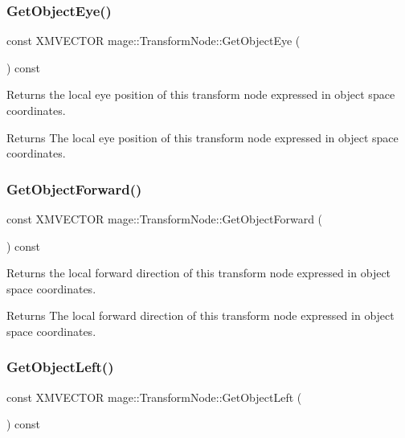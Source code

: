 \subsubsection{\texorpdfstring{Get\+Object\+Eye()}{GetObjectEye()}}
{\footnotesize\ttfamily const X\+M\+V\+E\+C\+T\+OR mage\+::\+Transform\+Node\+::\+Get\+Object\+Eye (\begin{DoxyParamCaption}{ }\end{DoxyParamCaption}) const}

Returns the local eye position of this transform node expressed in object space coordinates.

\begin{DoxyReturn}{Returns}
The local eye position of this transform node expressed in object space coordinates. 
\end{DoxyReturn}
\hypertarget{classmage_1_1_transform_node_a2f3c5ea3a0a301181b611b808842c70a}{}\label{classmage_1_1_transform_node_a2f3c5ea3a0a301181b611b808842c70a} 
\subsubsection{\texorpdfstring{Get\+Object\+Forward()}{GetObjectForward()}}
{\footnotesize\ttfamily const X\+M\+V\+E\+C\+T\+OR mage\+::\+Transform\+Node\+::\+Get\+Object\+Forward (\begin{DoxyParamCaption}{ }\end{DoxyParamCaption}) const}

Returns the local forward direction of this transform node expressed in object space coordinates.

\begin{DoxyReturn}{Returns}
The local forward direction of this transform node expressed in object space coordinates. 
\end{DoxyReturn}
\hypertarget{classmage_1_1_transform_node_aecea886df8ed9946ab2119ae365315bf}{}\label{classmage_1_1_transform_node_aecea886df8ed9946ab2119ae365315bf} 
\subsubsection{\texorpdfstring{Get\+Object\+Left()}{GetObjectLeft()}}
{\footnotesize\ttfamily const X\+M\+V\+E\+C\+T\+OR mage\+::\+Transform\+Node\+::\+Get\+Object\+Left (\begin{DoxyParamCaption}{ }\end{DoxyParamCaption}) const}

